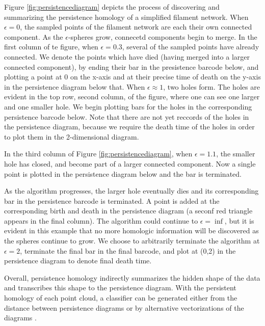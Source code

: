 \documentclass[10pt]{article}
\begin{document}
Figure \ref{fig:persistencediagram} depicts the process of discovering and summarizing the persistence homology of a simplified filament network. When $\epsilon=0$, the sampled points of the filament network are each their own connected component. As the $\epsilon$-spheres grow, connecetd components begin to merge. In the first column of te figure, when $\epsilon=0.3$, several of the sampled points have already connected. We denote the points which have died (having merged into a larger connected component), by ending their bar in the presistence barcode below, and plotting a point at 0 on the x-axis and at their precise time of death on the y-axis in the persistence diagram below that. When $\epsilon\approx1$, two holes form. The holes are evident in the top row, second column, of the figure, where one can see one larger and one smaller hole. We begin plotting bars for the holes in the corresponding persistence barcode below. Note that there are not yet reccords of the holes in the persistence diagram, because we require the death time of the holes in order to plot them in the 2-dimensional diagram. 

In the third column of Figure \ref{fig:persistencediagram}, when $\epsilon=1.1$, the smaller hole has closed, and become part of a larger connected component. Now a single point is plotted in the persistence diagram below and the bar is terminated.

As the algorithm progresses, the larger hole eventually dies and its corresponding bar in the persistence barcode is terminated. A point is added at the corresponding birth and death in the persistence diagram (a seconf red triangle appears in the final column). The algorithm could continue to $\epsilon=\inf$, but it is evident in this example that no more homologic information will be discovered as the spheres continue to grow. We choose to arbitrarily terminate the algorithm at $\epsilon=2$, terminate the final bar in the final barcode, and plot at (0,2) in the persistence diagram to denote final death time.

Overall, persistence homology indirectly summarizes the hidden shape of the data and transcribes this shape to the persistence diagram. With the persistent homology of each point cloud, a classifier can be generated either from the distance \cite{marchese2018signal} between persistence diagrams or by alternative vectorizations of the diagrams \cite{adams2017persistence,bubenik2015statistical,maroulas2018stable}.
\end{document}
